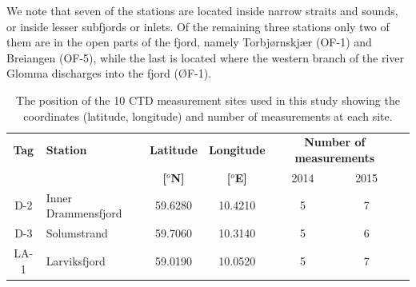 We note that seven of the  stations are located inside narrow straits and sounds, or inside lesser subfjords or inlets. Of the remaining three stations only two of them are in the open parts of the fjord, namely Torbj{\o}rnskj{\ae}r (OF-1) and Breiangen (OF-5), while the last is located where the western branch of the river Glomma discharges into the fjord ({\O}F-1).  

\begin{table}
\caption{The position of the 10 CTD measurement sites used in this study showing the coordinates (latitude, longitude) and number of measurements at each site.} 
\label{tab:CTD_pos} 
\centering 
\begin{tabular}{|clcccc@{}c|} 
\hline  
{\bf Tag} & {\bf Station} & {\bf Latitude} & {\bf Longitude} & \multicolumn{2}{c}{\bf Number of measurements} &\\ 
&& {\bf [$^o$N]} & {\bf [$^o$E]} & 2014 & 2015 &\\ \hline
D-2 & Inner Drammensfjord & 59.6280 & 10.4210 & 5 & 7 &\\ 
D-3 & Solumstrand & 59.7060 & 10.3140 & 5 & 6 &\\ \hline
LA-1 & Larviksfjord & 59.0190 & 10.0520 & 5 & 7 &\\ 

\end{tabular}
\end{table}
